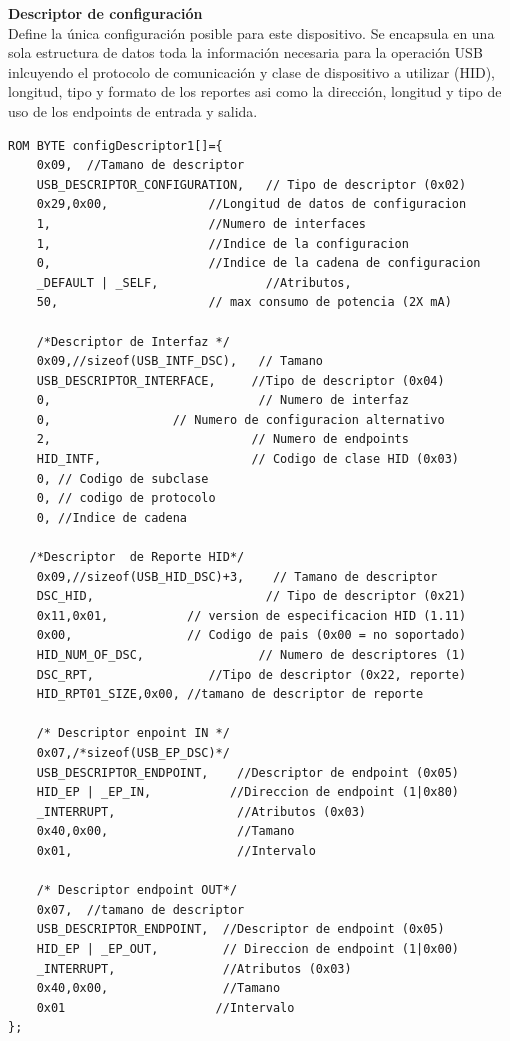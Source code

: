 \documentclass[letterpaper,openright,12pt]{book}
\begin{document}
\textbf{Descriptor de configuración}\\
Define la única configuración posible para este dispositivo. Se encapsula en una sola estructura de datos toda la información necesaria para la operación USB inlcuyendo el protocolo de comunicación y clase de dispositivo a utilizar (HID), longitud, tipo y formato de los reportes asi como la dirección, longitud y tipo de uso de los endpoints de entrada y salida.
\begin{lstlisting}
ROM BYTE configDescriptor1[]={
   	0x09,  //Tamano de descriptor
    USB_DESCRIPTOR_CONFIGURATION,   // Tipo de descriptor (0x02)
    0x29,0x00,              //Longitud de datos de configuracion
    1,                      //Numero de interfaces
    1,                      //Indice de la configuracion
    0,                      //Indice de la cadena de configuracion
    _DEFAULT | _SELF,               //Atributos,
    50,                     // max consumo de potencia (2X mA)
							
    /*Descriptor de Interfaz */
    0x09,//sizeof(USB_INTF_DSC),   // Tamano
    USB_DESCRIPTOR_INTERFACE,     //Tipo de descriptor (0x04)
    0,                             // Numero de interfaz
    0,                 // Numero de configuracion alternativo
    2,                            // Numero de endpoints
    HID_INTF,                     // Codigo de clase HID (0x03)
    0, // Codigo de subclase
    0, // codigo de protocolo
    0, //Indice de cadena

   /*Descriptor  de Reporte HID*/
    0x09,//sizeof(USB_HID_DSC)+3,    // Tamano de descriptor
    DSC_HID,                        // Tipo de descriptor (0x21)
    0x11,0x01,           // version de especificacion HID (1.11)
    0x00,                // Codigo de pais (0x00 = no soportado)
    HID_NUM_OF_DSC,                // Numero de descriptores (1)
    DSC_RPT,                //Tipo de descriptor (0x22, reporte)
    HID_RPT01_SIZE,0x00, //tamano de descriptor de reporte
    
    /* Descriptor enpoint IN */
    0x07,/*sizeof(USB_EP_DSC)*/
    USB_DESCRIPTOR_ENDPOINT,    //Descriptor de endpoint (0x05)
    HID_EP | _EP_IN,           //Direccion de endpoint (1|0x80)
    _INTERRUPT,                 //Atributos (0x03)
    0x40,0x00,                  //Tamano
    0x01,                       //Intervalo

    /* Descriptor endpoint OUT*/
    0x07,  //tamano de descriptor
    USB_DESCRIPTOR_ENDPOINT,  //Descriptor de endpoint (0x05)
    HID_EP | _EP_OUT,         // Direccion de endpoint (1|0x00)
    _INTERRUPT,               //Atributos (0x03)
    0x40,0x00,                //Tamano
    0x01                     //Intervalo
};
\end{lstlisting}
\end{document}
